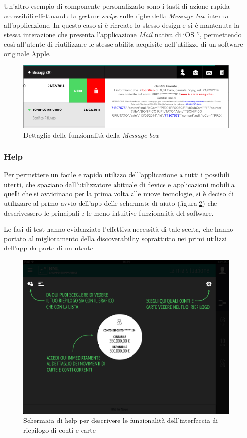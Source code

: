 Un'altro esempio di componente personalizzato sono i tasti di azione rapida accessibili effettuando la gesture \emph{swipe} sulle righe della \emph{Message box} interna all'applicazione.
In questo caso si è ricreato lo stesso design e si è mantenuta la stessa interazione che presenta l'applicazione \emph{Mail} nativa di iOS 7, permettendo così all'utente di riutilizzare le stesse abilità acquisite nell'utilizzo di un software originale Apple.
\begin{figure}[htbp]
\centering
\includegraphics[scale=0.50]{ux/messageBox.png}

\caption{Dettaglio delle funzionalità della \emph{Message box}}
\label{fig:selettore}
\end{figure}
\subsubsection{Help}
Per permettere un facile e rapido utilizzo dell'applicazione a tutti i possibili utenti, che spaziano dall'utilizzatore abituale di device e applicazioni mobili a quelli che si avvicinano per la prima volta alle nuove tecnologie, si è deciso di utilizzare al primo avvio dell'app delle schermate di aiuto (figura \ref{fig:help}) che descrivessero le principali  e le meno intuitive funzionalità del software.

Le fasi di test hanno evidenziato l'effettiva necessità di tale scelta, che hanno portato al miglioramento della discoverability soprattutto nei primi utilizzi dell'app da parte di un utente.

\begin{figure}[htbp]
\centering
\includegraphics[scale=0.20]{ux/help.jpg}

\caption{Schermata di help per descrivere le funzionalità dell'interfaccia di riepilogo di conti e carte}
\label{fig:help}
\end{figure}


